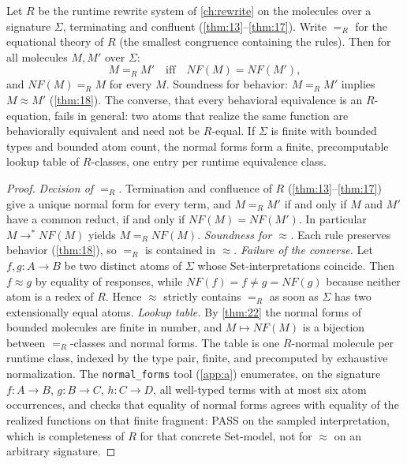 \begin{theorem}\label{thm:24}
 Let $R$ be the runtime rewrite system of
\autoref{ch:rewrite} on the molecules over a signature $\Sigma$,
terminating and confluent (\autoref{thm:13}--\autoref{thm:17}). Write
$=_R$ for the equational theory of $R$ (the smallest congruence
containing the rules). Then for all molecules $M, M'$ over $\Sigma$:
\[
M =_R M' \quad\text{iff}\quad \mathit{NF} (M) = \mathit{NF} (M'),
\]
and $\mathit{NF} (M) =_R M$ for every $M$. Soundness for behavior:
$M =_R M'$ implies $M \approx M'$ (\autoref{thm:18}). The converse,
that every behavioral equivalence is an $R$-equation, fails in
general: two atoms that realize the same function are behaviorally
equivalent and need not be $R$-equal. If $\Sigma$ is finite with
bounded types and bounded atom count, the normal forms form a finite,
precomputable lookup table of $R$-classes, one entry per runtime
equivalence class.
\end{theorem}

\begin{proof}
\emph{Decision of $=_R$.} Termination and confluence of $R$
(\autoref{thm:13}--\autoref{thm:17}) give a unique normal form for every
term, and $M =_R M'$ if and only if $M$ and $M'$ have a common reduct,
if and only if $\mathit{NF} (M) = \mathit{NF} (M')$. In particular
$M \to^{*} \mathit{NF} (M)$ yields $M =_R \mathit{NF} (M)$.
\emph{Soundness for $\approx$.} Each rule preserves behavior
(\autoref{thm:18}), so $=_R$ is contained in $\approx$.
\emph{Failure of the converse.} Let $f, g : A \to B$ be two distinct
atoms of $\Sigma$ whose Set-interpretations coincide. Then $f \approx g$
by equality of responses, while $\mathit{NF} (f) = f \neq g =
\mathit{NF} (g)$ because neither atom is a redex of $R$. Hence $\approx$
strictly contains $=_R$ as soon as $\Sigma$ has two extensionally equal
atoms.
\emph{Lookup table.} By \autoref{thm:22} the normal forms of bounded
molecules are finite in number, and $M \mapsto \mathit{NF} (M)$ is a
bijection between $=_R$-classes and normal forms. The table is one
$R$-normal molecule per runtime class, indexed by the type pair, finite,
and precomputed by exhaustive normalization. The \texttt{normal\_forms}
tool (\autoref{app:a}) enumerates, on the signature $f \colon A \to B$,
$g \colon B \to C$, $h \colon C \to D$, all well-typed terms with at most
six atom occurrences, and checks that equality of normal forms agrees
with equality of the realized functions on that finite fragment: PASS on
the sampled interpretation, which is completeness of $R$ for that
concrete Set-model, not for $\approx$ on an arbitrary signature.
\end{proof}


